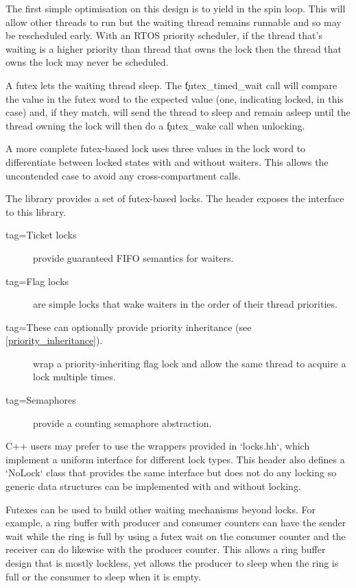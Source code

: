 The first simple optimisation on this design is to yield in the spin loop.
This will allow other threads to run but the waiting thread remains runnable and so may be rescheduled early.
With an RTOS priority scheduler, if the thread that's waiting is a higher priority than thread that owns the lock then the thread that owns the lock may never be scheduled.

A futex lets the waiting thread sleep.
The \c{futex_timed_wait} call will compare the value in the futex word to the expected value (one, indicating locked, in this case) and, if they match, will send the thread to sleep and remain asleep until the thread owning the lock will then do a \c{futex_wake} call when unlocking.

A more complete futex-based lock uses three values in the lock word to differentiate between locked states with and without waiters.
This allows the uncontended case to avoid any cross-compartment calls.

The  library provides a set of futex-based locks.
The  header exposes the interface to this library.

\begin{description}
	\item[tag=Ticket locks]{ provide guaranteed FIFO semantics for waiters.}
	\item[tag=Flag locks]{  are simple locks that wake waiters in the order of their thread priorities.}
	\item[tag=These can optionally provide priority inheritance (see \ref{priority_inheritance}).}
	\item[tag=Recursive mutexes]{ wrap a priority-inheriting flag lock and allow the same thread to acquire a lock multiple times.}
	\item[tag=Semaphores]{ provide a counting semaphore abstraction.}
\end{description}

C++ users may prefer to use the wrappers provided in `locks.hh`, which implement a uniform interface for different lock types.
This header also defines a `NoLock` class that provides the same interface but does not do any locking so generic data structures can be implemented with and without locking.

Futexes can be used to build other waiting mechanisms beyond locks.
For example, a ring buffer with producer and consumer counters can have the sender wait while the ring is full by using a futex wait on the consumer counter and the receiver can do likewise with the producer counter.
This allows a ring buffer design that is mostly lockless, yet allows the producer to sleep when the ring is full or the consumer to sleep when it is empty.

